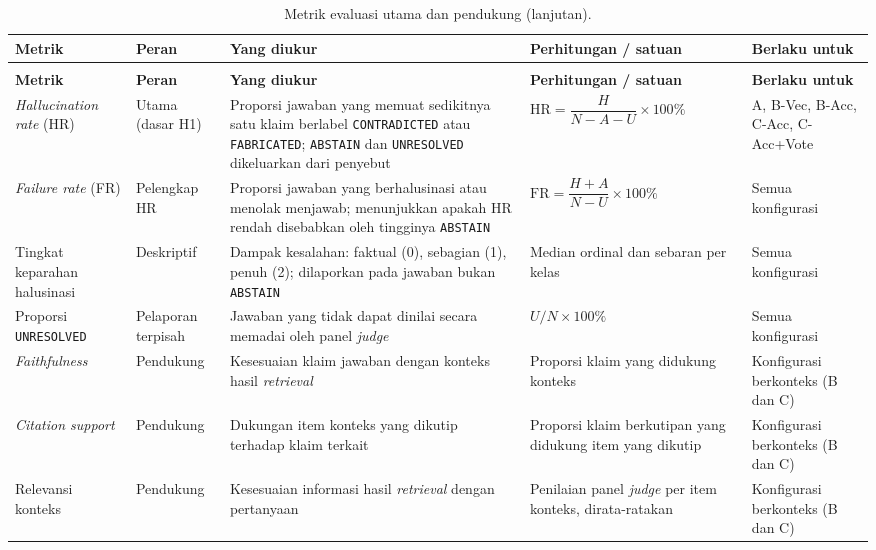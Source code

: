 \begingroup
\footnotesize
\setlength{\tabcolsep}{4pt}
\renewcommand{\arraystretch}{1.25}
\begin{longtable}{|>{\raggedright\arraybackslash}p{}|>{\raggedright\arraybackslash}p{}|>{\raggedright\arraybackslash}p{}|>{\raggedright\arraybackslash}p{}|>{\raggedright\arraybackslash}p{}|}
\caption{Metrik evaluasi utama dan pendukung.}
\label{tab:tab-metrik-evaluasi}\\
\hline
\textbf{Metrik} & \textbf{Peran} & \textbf{Yang diukur} & \textbf{Perhitungan / satuan} & \textbf{Berlaku untuk} \\
\hline
\endfirsthead
\caption[]{Metrik evaluasi utama dan pendukung (lanjutan).}\\
\hline
\textbf{Metrik} & \textbf{Peran} & \textbf{Yang diukur} & \textbf{Perhitungan / satuan} & \textbf{Berlaku untuk} \\
\hline
\endhead
\hline
\endfoot
\emph{Hallucination rate} (HR) & Utama (dasar H1) & Proporsi jawaban yang memuat sedikitnya satu klaim berlabel \texttt{CONTRADICTED} atau \texttt{FABRICATED}; \texttt{ABSTAIN} dan \texttt{UNRESOLVED} dikeluarkan dari penyebut & $\mathrm{HR}=\dfrac{H}{N-A-U}\times 100\%$ & A, B-Vec, B-Acc, C-Acc, C-Acc+Vote \\
\hline
\emph{Failure rate} (FR) & Pelengkap HR & Proporsi jawaban yang berhalusinasi atau menolak menjawab; menunjukkan apakah HR rendah disebabkan oleh tingginya \texttt{ABSTAIN} & $\mathrm{FR}=\dfrac{H+A}{N-U}\times 100\%$ & Semua konfigurasi \\
\hline
Tingkat keparahan halusinasi & Deskriptif & Dampak kesalahan: faktual (0), sebagian (1), penuh (2); dilaporkan pada jawaban bukan \texttt{ABSTAIN} & Median ordinal dan sebaran per kelas & Semua konfigurasi \\
\hline
Proporsi \texttt{UNRESOLVED} & Pelaporan terpisah & Jawaban yang tidak dapat dinilai secara memadai oleh panel \emph{judge} & $U/N\times 100\%$ & Semua konfigurasi \\
\hline
\emph{Faithfulness} & Pendukung & Kesesuaian klaim jawaban dengan konteks hasil \emph{retrieval} & Proporsi klaim yang didukung konteks & Konfigurasi berkonteks (B dan C) \\
\hline
\emph{Citation support} & Pendukung & Dukungan item konteks yang dikutip terhadap klaim terkait & Proporsi klaim berkutipan yang didukung item yang dikutip & Konfigurasi berkonteks (B dan C) \\
\hline
Relevansi konteks & Pendukung & Kesesuaian informasi hasil \emph{retrieval} dengan pertanyaan & Penilaian panel \emph{judge} per item konteks, dirata-ratakan & Konfigurasi berkonteks (B dan C) \\

\end{longtable}
